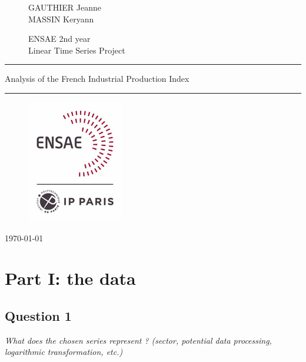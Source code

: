 \documentclass[]{article}
\begin{document}
	
\thispagestyle{empty}
\begin{figure}[!h]
	\centering
	\begin{minipage}{0.45 \linewidth}
		\centering
		\LARGE{GAUTHIER Jeanne}\\
		\LARGE{MASSIN Keryann}
	\end{minipage}
	\hfill
	\begin{minipage}{0.48 \linewidth}
		\centering
		\Large{ENSAE 2nd year}\\
		\Large{Linear Time Series Project}		
	\end{minipage}
\end{figure}

\bigskip
\bigskip
\bigskip
\bigskip
\bigskip
\bigskip

\hrule
\begin{center}
	\Huge{Analysis of the French Industrial Production Index}
\end{center}
\hrule

\bigskip
\bigskip

\begin{figure}[h!]
	\centering
	\includegraphics[scale=0.6]{ENSAE_logo.png}
\end{figure}
\bigskip
\bigskip
\bigskip
\begin{center}
	\today
\end{center}

\newpage
\tableofcontents

\newpage
\section{Part I: the data}
\subsection{Question 1}
\textit{What does the chosen series represent ? (sector, potential data processing, logarithmic transformation, etc.)}\\
\end{document}
